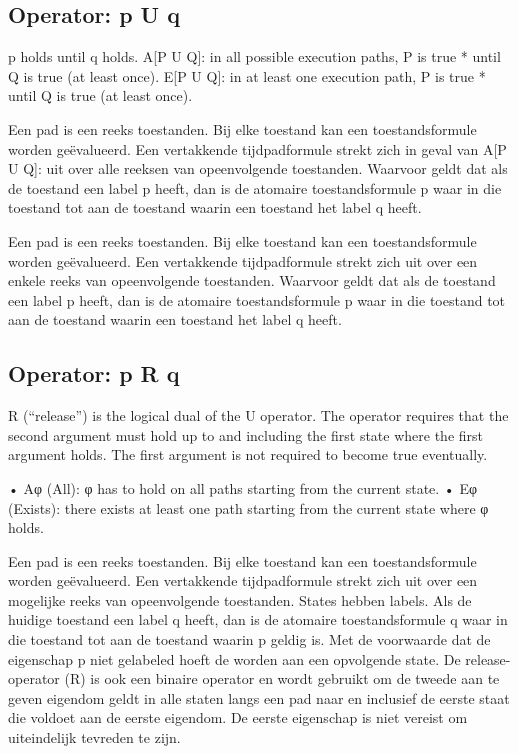 \documentclass{article}
\begin{document}
	\subsection{Operator: p U q}
	p holds until q holds.
	A[P U Q]: in all possible execution paths, P is true * until Q is true (at least once).
	E[P U Q]: in at least one execution path, P is true * until Q is true (at least once).
	
	Een pad is een reeks toestanden. Bij elke toestand kan een toestandsformule worden geëvalueerd. Een vertakkende tijdpadformule strekt zich in geval van A[P U Q]: uit over alle  reeksen van opeenvolgende toestanden.
	Waarvoor geldt dat als de   toestand een label p heeft, dan is de atomaire toestandsformule p waar in die toestand tot aan de toestand waarin een toestand het label q heeft.
	
	Een pad is een reeks toestanden. Bij elke toestand kan een toestandsformule worden geëvalueerd. Een vertakkende tijdpadformule strekt zich uit over een enkele reeks van opeenvolgende toestanden.
	Waarvoor geldt dat als de   toestand een label p heeft, dan is de atomaire toestandsformule p waar in die toestand tot aan de toestand waarin een toestand het label q heeft.
	
	\subsection{Operator: p R q}
	R (“release”) is the logical dual of the U operator. The operator requires
	that the second argument must hold up to and including the
	first state where the first argument holds. The first argument is not
	required to become true eventually.
	
	• Aφ (All): φ has to hold on all paths starting from the current state.
	• Eφ (Exists): there exists at least one path starting from the current state where φ
	holds.
	
	Een pad is een reeks toestanden. Bij elke toestand kan een toestandsformule worden geëvalueerd. Een vertakkende tijdpadformule strekt zich uit over een mogelijke reeks van opeenvolgende toestanden.
	States hebben labels. Als de huidige toestand een label q heeft, dan is de atomaire toestandsformule q  waar in die toestand tot aan de toestand waarin p geldig is. Met de voorwaarde dat de eigenschap p niet gelabeled hoeft de worden aan een opvolgende state.	
	De release-operator (R) is ook een binaire operator en wordt gebruikt om de tweede aan te geven
	eigendom geldt in alle staten langs een pad naar
	en inclusief de eerste staat die voldoet aan de
	eerste eigendom. De eerste eigenschap is niet vereist
	om uiteindelijk tevreden te zijn.
	
\end{document}
